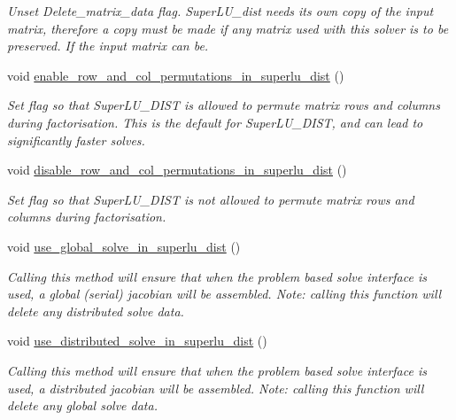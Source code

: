 \begin{DoxyCompactItemize}
\begin{DoxyCompactList}\small\item\em Unset Delete\+\_\+matrix\+\_\+data flag. Super\+L\+U\+\_\+dist needs its own copy of the input matrix, therefore a copy must be made if any matrix used with this solver is to be preserved. If the input matrix can be. \end{DoxyCompactList}\item 
void \hyperlink{classoomph_1_1SuperLUSolver_a9489a249d736316901e1644e73aa55b9}{enable\+\_\+row\+\_\+and\+\_\+col\+\_\+permutations\+\_\+in\+\_\+superlu\+\_\+dist} ()
\begin{DoxyCompactList}\small\item\em Set flag so that Super\+L\+U\+\_\+\+D\+I\+ST is allowed to permute matrix rows and columns during factorisation. This is the default for Super\+L\+U\+\_\+\+D\+I\+ST, and can lead to significantly faster solves. \end{DoxyCompactList}\item 
void \hyperlink{classoomph_1_1SuperLUSolver_a3386eb5e27caa80d9c63a6061a304680}{disable\+\_\+row\+\_\+and\+\_\+col\+\_\+permutations\+\_\+in\+\_\+superlu\+\_\+dist} ()
\begin{DoxyCompactList}\small\item\em Set flag so that Super\+L\+U\+\_\+\+D\+I\+ST is not allowed to permute matrix rows and columns during factorisation. \end{DoxyCompactList}\item 
void \hyperlink{classoomph_1_1SuperLUSolver_a4eac19f126f7da82f6af48416410442a}{use\+\_\+global\+\_\+solve\+\_\+in\+\_\+superlu\+\_\+dist} ()
\begin{DoxyCompactList}\small\item\em Calling this method will ensure that when the problem based solve interface is used, a global (serial) jacobian will be assembled. Note\+: calling this function will delete any distributed solve data. \end{DoxyCompactList}\item 
void \hyperlink{classoomph_1_1SuperLUSolver_a400adf19a2051b05baec7a300bda5406}{use\+\_\+distributed\+\_\+solve\+\_\+in\+\_\+superlu\+\_\+dist} ()
\begin{DoxyCompactList}\small\item\em Calling this method will ensure that when the problem based solve interface is used, a distributed jacobian will be assembled. Note\+: calling this function will delete any global solve data. \end{DoxyCompactList}\end{DoxyCompactItemize}
